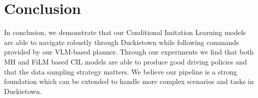 \chapter{Conclusion}
\label{chapter:conclusion}

In conclusion, we demonstrate that our Conditional Imitation Learning models are able to navigate robustly through Duckietown while following commands provided by our VLM-based planner.
Through our experiments we find that both MH and FiLM based CIL models are able to produce good driving policies and that the data sampling strategy matters. We believe our pipeline is a strong foundation which can be extended to handle more complex scenarios and tasks in Duckietown.
